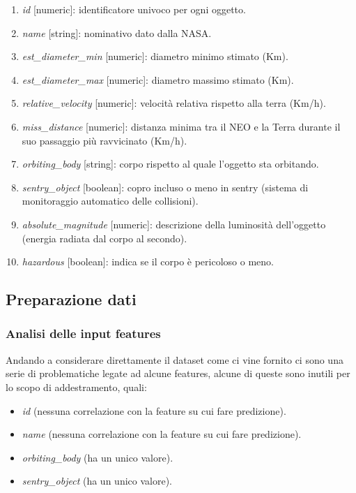 \documentclass[italian,12pt,a4paper]{article}
\begin{document}
	\begin{enumerate}
		\item \textit{id} [numeric]: identificatore univoco per ogni oggetto.
		\item \textit{name} [string]: nominativo dato dalla NASA.
		\item \textit{est\_diameter\_min} [numeric]: diametro minimo stimato (Km).
		\item \textit{est\_diameter\_max} [numeric]: diametro massimo stimato (Km).
		\item \textit{relative\_velocity} [numeric]: velocità relativa rispetto alla terra (Km/h).
		\item \textit{miss\_distance }[numeric]: distanza minima tra il NEO e la Terra durante il suo passaggio più ravvicinato (Km/h).
		\item \textit{orbiting\_body} [string]: corpo rispetto al quale l’oggetto sta orbitando.
		\item \textit{sentry\_object} [boolean]: copro incluso o meno in sentry (sistema di monitoraggio automatico delle collisioni).
		\item \textit{absolute\_magnitude} [numeric]: descrizione della luminosità dell’oggetto (energia radiata dal corpo al secondo).
		\item \textit{hazardous} [boolean]: indica se il corpo è pericoloso o meno.
	\end{enumerate}
	
	\subsection{Preparazione dati}
	
	\subsubsection{Analisi delle input features}
	Andando a considerare direttamente il dataset come ci vine fornito ci sono una serie di problematiche legate ad alcune features, alcune di queste sono inutili per lo scopo di addestramento, quali: 
	
	\begin{itemize}
		\item \textit{id} (nessuna correlazione con la feature su cui fare predizione).
		\item \textit{name} (nessuna correlazione con la feature su cui fare predizione).
		\item \textit{orbiting\_body} (ha un unico valore).
		\item \textit{sentry\_object} (ha un unico valore).
	\end{itemize}
	
\end{document}

